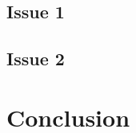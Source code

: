 \documentclass[11pt,en]{elegantpaper}
\begin{document}
\subsection{Issue 1}

\subsection{Issue 2}

\section{Conclusion}




\end{document}
